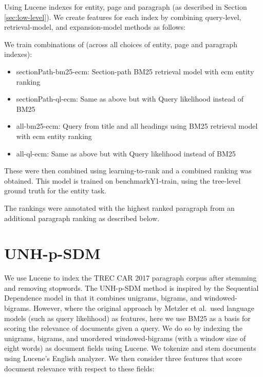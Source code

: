 \documentclass{article}
\begin{document}
Using Lucene indexes for %
entity, page and paragraph (as described in Section \ref{sec:low-level}). We create features for each index by combining query-level, retrieval-model, and expansion-model methods as follows:

We train combinations of (across all choices of entity, page and paragraph indexes):
\begin{itemize}
    \item sectionPath-bm25-ecm: Section-path BM25 retrieval model with ecm entity ranking
    \item sectionPath-ql-ecm: Same as above but with Query likelihood instead of BM25
    \item all-bm25-ecm: Query from title and all headings using BM25 retrieval model with ecm entity ranking
    \item all-ql-ecm: Same as above but with Query likelihood instead of BM25
\end{itemize}



These were then combined using  learning-to-rank and a combined ranking was obtained. 
This model is trained on benchmarkY1-train, using the tree-level ground truth for the entity task.

The rankings were annotated with the highest ranked paragraph from an additional paragraph ranking as described below.


\section{UNH-p-SDM}\label{sec:sdm}

We use Lucene to index the TREC CAR 2017 paragraph corpus after stemming and removing stopwords.
The UNH-p-SDM method is inspired by the Sequential Dependence model \cite{metzler2005markov} in that it combines unigrams, bigrams, and windowed-bigrams. However, where the original approach by Metzler et al.\ used language models (such as query likelihood) as features, here we use BM25 as a basis for scoring the relevance of documents given a query. We do so by indexing the unigrams, bigrams, and unordered windowed-bigrams (with a window size of eight words) as document fields using Lucene. We tokenize and stem documents using Lucene's English analyzer. We then consider three features that score document relevance with respect to these fields:
 
\end{document}
